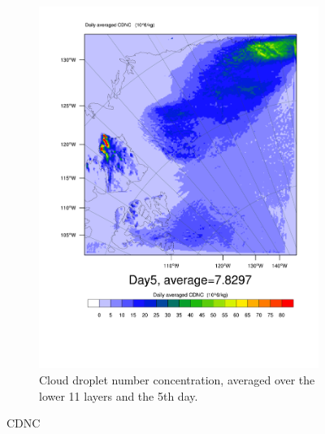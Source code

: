\begin{figure}
\begin{subfigure}{0.48\textwidth}
		\includegraphics[width=\textwidth]{results/control/QNCLOUD_day5.pdf}
		\caption{Cloud droplet number concentration, averaged over the lower 11 layers and the 5th day.}
		\label{subfig:cdnc_cont_Day5}
	\end{subfigure}
	\caption{CDNC}
	\label{fig:cdnc}
\end{figure}

